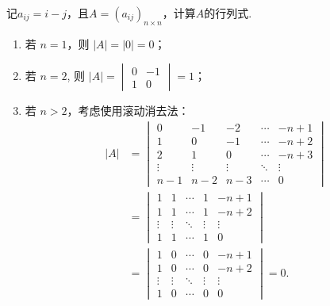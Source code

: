 \begin{exercise}
\begin{exgroup}
        \item 记$a_{ij}=i-j$，且$A=(a_{ij})_{n\times n}$，计算$A$的行列式.
        \begin{answer}
            \begin{enumerate}
                \item 若 $n=1$，则 $|A| = |0| = 0$；

                \item 若 $n=2$, 则 $|A| = \begin{vmatrix} 0 & -1 \\ 1 & 0 \end{vmatrix} = 1$；

                \item 若 $n>2$，考虑使用滚动消去法：
                    \begin{align*}
                        |A| &= \begin{vmatrix}
                            0      & -1     & -2     & \cdots & -n+1   \\
                            1      & 0      & -1     & \cdots & -n+2   \\
                            2      & 1      & 0      & \cdots & -n+3   \\
                            \vdots & \vdots & \vdots & \ddots & \vdots \\
                            n-1    & n-2    & n-3    & \cdots & 0
                        \end{vmatrix} \\
                        &= \begin{vmatrix}
                            1 & 1 & \cdots & 1 & -n+1 \\
                            1 & 1 & \cdots & 1 & -n+2 \\
                            \vdots & \vdots & \ddots & \vdots & \vdots \\
                            1 & 1 & \cdots & 1 & 0
                        \end{vmatrix} \\
                        &= \begin{vmatrix}
                            1 & 0 & \cdots & 0 & -n+1 \\
                            1 & 0 & \cdots & 0 & -n+2 \\
                            \vdots & \vdots & \ddots & \vdots & \vdots \\
                            1 & 0 & \cdots & 0 & 0
                        \end{vmatrix}
                        = 0.
                    \end{align*}
            \end{enumerate}
        \end{answer}


\end{exgroup}
\end{exercise}
